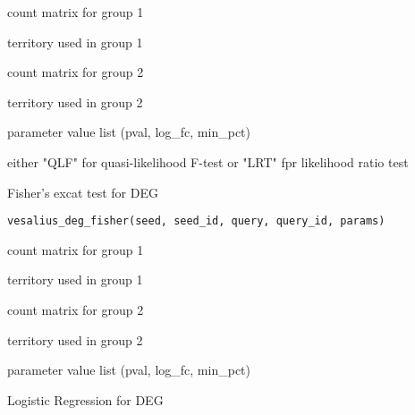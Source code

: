 \documentclass[a4paper]{book}
\begin{document}
%
\begin{Arguments}
\begin{ldescription}
\item[\code{seed}] count matrix for group 1

\item[\code{seed\_id}] territory used in group 1

\item[\code{query}] count matrix for group 2

\item[\code{query\_id}] territory used in group 2

\item[\code{params}] parameter value list (pval, log\_fc, min\_pct)

\item[\code{type}] either "QLF" for quasi-likelihood F-test or 
"LRT" fpr likelihood ratio test
\end{ldescription}
\end{Arguments}
%
\begin{Description}
Fisher's excat test for DEG
\end{Description}
%
\begin{Usage}
\begin{verbatim}
vesalius_deg_fisher(seed, seed_id, query, query_id, params)
\end{verbatim}
\end{Usage}
%
\begin{Arguments}
\begin{ldescription}
\item[\code{seed}] count matrix for group 1

\item[\code{seed\_id}] territory used in group 1

\item[\code{query}] count matrix for group 2

\item[\code{query\_id}] territory used in group 2

\item[\code{params}] parameter value list (pval, log\_fc, min\_pct)
\end{ldescription}
\end{Arguments}
%
\begin{Description}
Logistic Regression for DEG
\end{Description}
\end{document}
